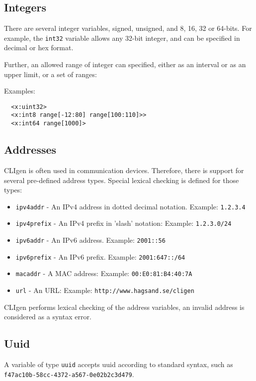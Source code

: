 \documentclass[a4paper, 10pt] {article}
\begin{document}
\subsection{Integers}
There are several integer variables, signed, unsigned, and 8, 16, 32 or 64-bits. For example, the {\tt int32} variable allows any 32-bit integer, and can be specified in decimal or hex format. 

Further, an allowed range of integer can specified, either as an interval or as an upper limit, or a set of ranges:

Examples:
\begin{verbatim}
  <x:uint32>
  <x:int8 range[-12:80] range[100:110]>>
  <x:int64 range[1000]>
\end{verbatim}

\subsection{Addresses}

CLIgen is often used in communication devices. Therefore, there is
support for several pre-defined address types.  Special lexical
checking is defined for those types:

\begin{itemize}
\item {\tt ipv4addr} - An IPv4 address in dotted decimal notation. Example: {\tt 1.2.3.4}
\item {\tt ipv4prefix} - An IPv4 prefix in 'slash' notation: Example: {\tt 1.2.3.0/24}
\item {\tt ipv6addr} - An IPv6 address. Example: {\tt 2001::56}
\item {\tt ipv6prefix} - An IPv6 prefix. Example: {\tt 2001:647::/64}
\item {\tt macaddr} - A MAC address: Example: {\tt 00:E0:81:B4:40:7A}
\item {\tt url} - An URL: Example: {\tt http://www.hagsand.se/cligen}
\end{itemize}

CLIgen performs lexical checking of the address variables, an invalid
address is considered as a syntax error.

\subsection{Uuid}

A variable of type {\tt uuid} accepts uuid according to standard syntax,
such as {\tt f47ac10b-58cc-4372-a567-0e02b2c3d479}. 
\end{document}
